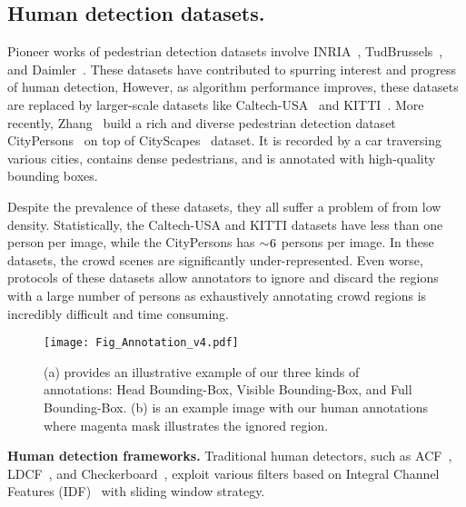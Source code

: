 \documentclass[10pt,twocolumn,letterpaper]{article}
\newcommand{\myparagraph}[1]{{\vspace{0.5em} \noindent \bf #1}}
\begin{document}
\subsection{Human detection datasets.} 
Pioneer works of pedestrian detection datasets involve INRIA~\cite{dalal2005histograms}, TudBrussels~\cite{wojek2009multi}, and Daimler~\cite{enzweiler2009monocular}. These datasets have contributed to spurring interest and progress of human detection, However, as algorithm performance improves, these datasets are replaced by larger-scale datasets like Caltech-USA~\cite{dollar2009pedestrian} and KITTI~\cite{Geiger2012CVPR}. More recently, Zhang \etal~build a rich and diverse pedestrian detection dataset CityPersons~\cite{zhang2017citypersons} on top of CityScapes~\cite{cordts2016cityscapes} dataset. It is recorded by a car traversing various cities, contains dense pedestrians, and is annotated with high-quality bounding boxes. 

Despite the prevalence of these datasets, they all suffer a problem of from low density. Statistically, the Caltech-USA and KITTI datasets have less than one person per image, while the CityPersons has $\sim\negmedspace 6$ persons per image. In these datasets, the crowd scenes are significantly under-represented. Even worse, protocols of these datasets allow annotators to ignore and discard the regions with a large number of persons as exhaustively annotating crowd regions is incredibly difficult and time consuming. 



\begin{figure*}
\centering
\texttt{[image: Fig\_Annotation\_v4.pdf]}
\caption{(a) provides an illustrative example of our three kinds of annotations: Head Bounding-Box, Visible Bounding-Box, and Full Bounding-Box. (b) is an example image with our human annotations where magenta mask illustrates the ignored region.}
\label{fig:annotation_example}
\end{figure*}

\myparagraph{Human detection frameworks.} 
Traditional human detectors, such as ACF~\cite{dollar2014fast}, LDCF~\cite{nam2014local}, and Checkerboard~\cite{zhang2015filtered}, exploit various filters based on Integral Channel Features (IDF)~\cite{dollar2009integral} with sliding window strategy. 
\end{document}
